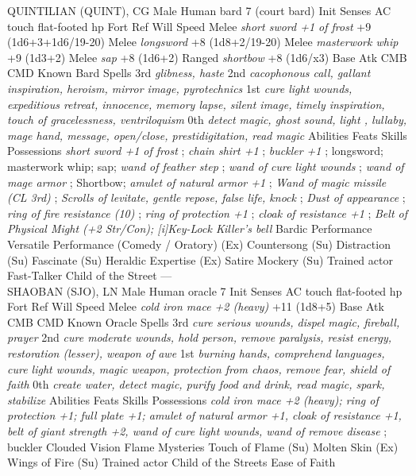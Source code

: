 QUINTILIAN (QUINT), CG Male Human bard 7 (court bard)  Init Senses  AC touch flat-footed  hp  Fort Ref Will  Speed  Melee  {\itshape short sword +1 of frost} +9 (1d6+3+1d6/19-20)  Melee  {\itshape longsword} +8 (1d8+2/19-20)  Melee  {\itshape masterwork whip} +9 (1d3+2)  Melee  {\itshape sap} +8 (1d6+2)  Ranged  {\itshape shortbow} +8 (1d6/x3)  Base Atk CMB CMD  Known Bard Spells  3rd  {\itshape glibness, haste}   2nd  {\itshape cacophonous call, gallant inspiration, heroism, mirror image, pyrotechnics}   1st  {\itshape cure light wounds, expeditious retreat, innocence, memory lapse, silent image, timely inspiration, touch of gracelessness, ventriloquism}   0th  {\itshape detect magic, ghost sound, light , lullaby, mage hand, message, open/close, prestidigitation, read magic}   Abilities  Feats  Skills  Possessions  {\itshape short sword +1 of frost} ;  {\itshape chain shirt +1} ;  {\itshape buckler +1} ; longsword; masterwork whip; sap;  {\itshape wand of feather step} ;  {\itshape wand of cure light wounds} ;  {\itshape wand of mage armor} ; Shortbow;  {\itshape amulet of natural armor +1} ;  {\itshape Wand of magic missile (CL 3rd)} ;  {\itshape Scrolls of levitate, gentle repose, false life, knock} ;  {\itshape Dust of appearance} ;  {\itshape ring of fire resistance (10)} ;  {\itshape ring of protection +1} ;  {\itshape cloak of resistance +1} ;  {\itshape Belt of Physical Might (+2 Str/Con);  [i]Key-Lock Killer's bell}  Bardic Performance  Versatile Performance (Comedy / Oratory) (Ex)  Countersong (Su)  Distraction (Su)  Fascinate (Su)  Heraldic Expertise (Ex)  Satire  Mockery (Su) Trained actor  Fast-Talker  Child of the Street ---\\

SHAOBAN (SJO), LN Male Human oracle 7  Init Senses  AC touch flat-footed  hp  Fort Ref Will  Speed  Melee  {\itshape cold iron mace +2 (heavy)} +11 (1d8+5)  Base Atk CMB CMD  Known Oracle Spells  3rd  {\itshape cure serious wounds, dispel magic, fireball, prayer}   2nd  {\itshape cure moderate wounds, hold person, remove paralysis, resist energy, restoration (lesser), weapon of awe}   1st  {\itshape burning hands, comprehend languages, cure light wounds, magic weapon, protection from chaos, remove fear, shield of faith}   0th  {\itshape create water, detect magic, purify food and drink, read magic, spark, stabilize}   Abilities  Feats  Skills  Possessions  {\itshape cold iron mace +2 (heavy); ring of protection +1; full plate +1; amulet of natural armor +1, cloak of resistance +1, belt of giant strength +2, wand of cure light wounds, wand of remove disease} ; buckler Clouded Vision  Flame Mysteries  Touch of Flame (Su)   Molten Skin (Ex)  Wings of Fire (Su) Trained actor  Child of the Streets  Ease of Faith 